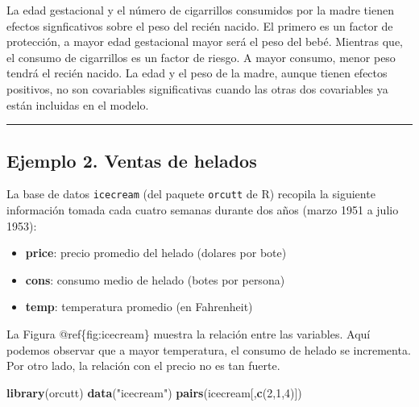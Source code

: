 \documentclass[
]{article}
\newenvironment{Shaded}{\begin{snugshade}}{\end{snugshade}}
\newcommand{\DecValTok}[1]{\textcolor[rgb]{0.00,0.00,0.81}{#1}}
\newcommand{\FunctionTok}[1]{\textcolor[rgb]{0.13,0.29,0.53}{\textbf{#1}}}
\newcommand{\NormalTok}[1]{#1}
\newcommand{\StringTok}[1]{\textcolor[rgb]{0.31,0.60,0.02}{#1}}
\providecommand{\tightlist}{%
  \setlength{\itemsep}{0pt}\setlength{\parskip}{0pt}}
\begin{document}
La edad gestacional y el número de cigarrillos consumidos por la madre tienen efectos signficativos sobre el peso del recién nacido. El primero es un factor de protección, a mayor edad gestacional mayor será el peso del bebé. Mientras que, el consumo de cigarrillos es un factor de riesgo. A mayor consumo, menor peso tendrá el recién nacido. La edad y el peso de la madre, aunque tienen efectos positivos, no son covariables significativas cuando las otras dos covariables ya están incluidas en el modelo.

\rule{\textwidth}{0.4pt}

\hypertarget{ejemplo-2.-ventas-de-helados}{%
\subsection*{Ejemplo 2. Ventas de helados}\label{ejemplo-2.-ventas-de-helados}}

La base de datos \texttt{icecream} (del paquete \texttt{orcutt} de R) recopila la siguiente información tomada cada cuatro semanas durante dos años (marzo 1951 a julio 1953):

\begin{itemize}
\tightlist
\item
  \textbf{price}: precio promedio del helado (dolares por bote)
\item
  \textbf{cons}: consumo medio de helado (botes por persona)
\item
  \textbf{temp}: temperatura promedio (en Fahrenheit)
\end{itemize}

La Figura @ref\{fig:icecream\} muestra la relación entre las variables. Aquí podemos observar que a mayor temperatura, el consumo de helado se incrementa. Por otro lado, la relación con el precio no es tan fuerte.

\begin{Shaded}
\begin{Highlighting}[]
\FunctionTok{library}\NormalTok{(orcutt)}
\FunctionTok{data}\NormalTok{(}\StringTok{"icecream"}\NormalTok{)}
\FunctionTok{pairs}\NormalTok{(icecream[,}\FunctionTok{c}\NormalTok{(}\DecValTok{2}\NormalTok{,}\DecValTok{1}\NormalTok{,}\DecValTok{4}\NormalTok{)])}
\end{Highlighting}
\end{Shaded}
\end{document}
